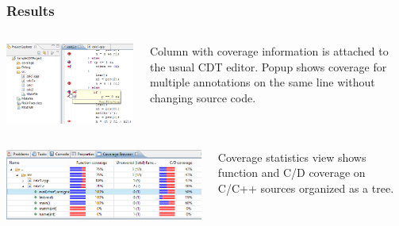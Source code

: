 \documentclass{beamer}
\begin{document}
\begin{frame}
  \frametitle{Results}
\begin{columns}[T]
\begin{column}{.6\textwidth}
    \includegraphics[scale=0.5]{plugin_source.png}
\end{column}
\begin{column}{.4\textwidth}
Column with coverage information is attached to the usual CDT editor. 
Popup shows coverage for multiple annotations on the same line without changing source code.
\end{column}
\end{columns}
\begin{columns}[T]
\begin{column}{.6\textwidth}
  \includegraphics[scale=0.4]{plugin_stat.png}
\end{column}
\begin{column}{.4\textwidth}
Coverage statistics view shows function and C/D coverage on C/C++ sources organized as a tree.
\end{column}
\end{columns}
\end{frame}
\end{document}
